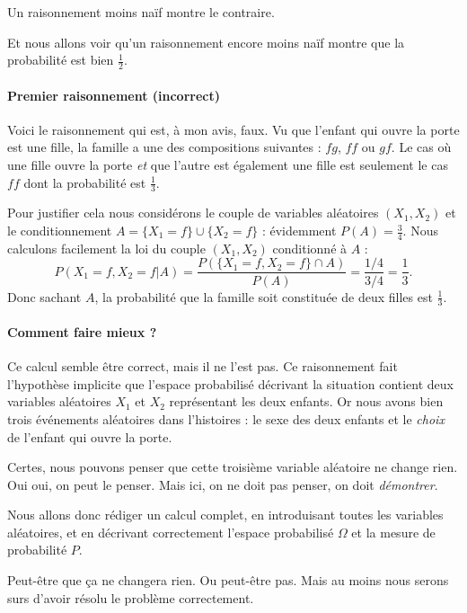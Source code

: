 Un raisonnement moins naïf montre le contraire. 

Et nous allons voir qu'un raisonnement encore moins naïf montre que la probabilité est bien \( \frac{ 1 }{2}\).

\paragraph{Premier raisonnement (incorrect)}

Voici le raisonnement qui est, à mon avis, faux. Vu que l'enfant qui ouvre la porte est une fille, la famille a une des compositions suivantes : \( fg\), \( ff\) ou \( gf\). Le cas où une fille ouvre la porte \emph{et} que l'autre est également une fille est seulement le cas \( ff\) dont la probabilité est \( \frac{1}{ 3 }\). 

Pour justifier cela nous considérons le couple de variables aléatoires \( \left( X_1,X_2 \right)\) et le conditionnement \( A=\{ X_1=f \}\cup\{ X_2=f \}\) : évidemment \( P(A)=\frac{ 3 }{ 4 }\). Nous calculons facilement la loi du couple \( (X_1,X_2)\) conditionné à \( A\) :
\begin{equation}
    P(X_1=f,X_2=f|A)=\frac{ P(  \{ X_1=f,X_2=f \}\cap A  ) }{ P(A) }=\frac{ 1/4 }{ 3/4 }=\frac{1}{ 3 }.
\end{equation}
Donc sachant \( A\), la probabilité que la famille soit constituée de deux filles est \( \frac{1}{ 3 }\).

\paragraph{Comment faire mieux ?}

Ce calcul semble être correct, mais il ne l'est pas. Ce raisonnement fait l'hypothèse implicite que l'espace probabilisé décrivant la situation contient deux variables aléatoires \( X_1\) et \( X_2\) représentant les deux enfants. Or nous avons bien trois événements aléatoires dans l'histoires : le sexe des deux enfants et le \emph{choix} de l'enfant qui ouvre la porte.

Certes, nous pouvons penser que cette troisième variable aléatoire ne change rien. Oui oui, on peut le penser. Mais ici, on ne doit pas penser, on doit \emph{démontrer}. 

Nous allons donc rédiger un calcul complet, en introduisant toutes les variables aléatoires, et en décrivant correctement l'espace probabilisé \( \Omega\) et la mesure de probabilité \( P\).

Peut-être que ça ne changera rien. Ou peut-être pas. Mais au moins nous serons surs d'avoir résolu le problème correctement.

